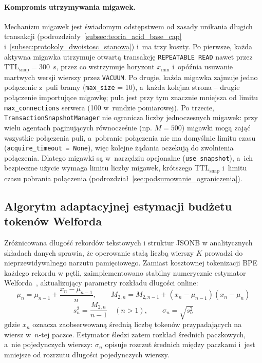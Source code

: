 \paragraph{Kompromis utrzymywania migawek.}
Mechanizm migawek jest świadomym odstępstwem od zasady unikania długich transakcji (podrozdziały~\ref{subsec:teoria_acid_base_cap} i~\ref{subsec:protokoly_dwoistosc_stanowa}) i~ma trzy koszty. Po pierwsze, każda aktywna migawka utrzymuje otwartą transakcję \texttt{REPEATABLE READ} nawet przez $\text{TTL}_{\text{snap}} = 300$~s, przez co wstrzymuje horyzont $x_{\text{min}}$ i~opóźnia usuwanie martwych wersji wierszy przez \texttt{VACUUM}. Po drugie, każda migawka zajmuje jedno połączenie z~puli bramy (\texttt{max\_size} = 10), a~każda kolejna strona -- drugie połączenie importujące migawkę; pula jest przy tym znacznie mniejsza od limitu \texttt{max\_connections} serwera (100 w~rundzie pomiarowej). Po trzecie, \texttt{TransactionSnapshotManager} nie ogranicza liczby jednoczesnych migawek: przy wielu agentach paginujących równocześnie (np. $M = 500$) migawki mogą zająć wszystkie połączenia puli, a~pobranie połączenia nie ma domyślnie limitu czasu (\texttt{acquire\_timeout = None}), więc kolejne żądania oczekują do zwolnienia połączenia. Dlatego migawki są w~narzędziu opcjonalne (\texttt{use\_snapshot}), a~ich bezpieczne użycie wymaga limitu liczby migawek, krótszego $\text{TTL}_{\text{snap}}$ i~limitu czasu pobrania połączenia (podrozdział~\ref{sec:podsumowanie_ograniczenia}).

\subsection{Algorytm adaptacyjnej estymacji budżetu tokenów Welforda}
\label{subsec:projekt_welford_estymator}

Zróżnicowana długość rekordów tekstowych i struktur JSONB w analitycznych składach danych sprawia, że operowanie stałą liczbą wierszy $K$ prowadzi do nieprzewidywalnego narzutu pamięciowego. Zamiast kosztownej tokenizacji BPE każdego rekordu w pętli, zaimplementowano stabilny numerycznie estymator Welforda~\cite{welford1962}, aktualizujący parametry rozkładu długości online:
\begin{equation}
\mu_n = \mu_{n-1} + \frac{x_n - \mu_{n-1}}{n}, \qquad M_{2,n} = M_{2,n-1} + (x_n - \mu_{n-1})(x_n - \mu_n)
\label{eq:welford_mean_m2}
\end{equation}
\begin{equation}
s_n^2 = \frac{M_{2,n}}{n - 1} \quad (n > 1), \qquad \sigma_n = \sqrt{s_n^2}
\label{eq:welford_variance}
\end{equation}
gdzie $x_n$ oznacza zaobserwowaną średnią liczbę tokenów przypadających na wiersz w~$n$-tej paczce. Estymator śledzi zatem rozkład średnich paczkowych, a~nie pojedynczych wierszy: $\sigma_n$ opisuje rozrzut średnich między paczkami i~jest mniejsze od rozrzutu długości pojedynczych wierszy.

